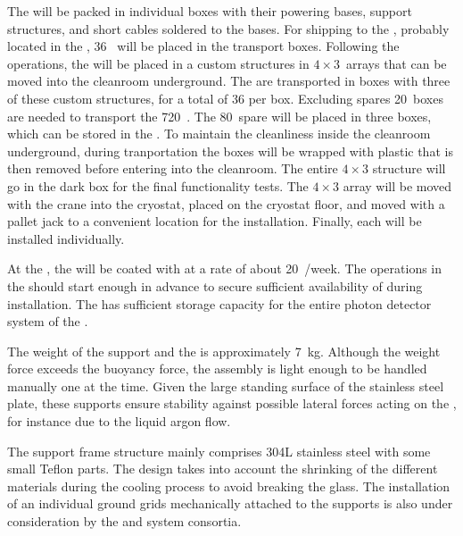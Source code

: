 The  will be packed in individual boxes with their powering bases, support structures, and short  cables soldered to the bases.
For shipping to the , probably located in the , 36~ will  be placed in the transport boxes.
Following the  operations, the  will be placed in a custom structures in $4 \times 3$~arrays that can be moved into the cleanroom underground.
The  are transported in boxes with three of these custom structures, for a total of 36 per box.
Excluding spares 20~boxes are needed to transport the 720~.
The 80~spare  will be placed in three boxes, which can be stored in the .
To maintain the cleanliness inside the cleanroom underground, during tranportation the boxes will be wrapped with plastic that is then removed before entering into the cleanroom.
The entire $4 \times 3$ structure will go in the dark box for the final functionality tests.
The $4 \times 3$ array will be moved with the crane into the cryostat, placed on the cryostat floor, and moved with a pallet jack to a convenient location for the installation. Finally, each  will be installed individually.

At the , the  will be coated with  at a rate of about 20~/week.
The operations in the  should start enough in advance to secure sufficient availability of  during installation.
The  has sufficient storage capacity for the entire photon detector system of the .

The weight of the support and the  is approximately 7~kg.
Although the weight force exceeds the buoyancy force, the assembly is light enough to be handled manually one at the time. 
Given the large standing surface of the stainless steel plate, these supports ensure stability against possible lateral forces acting on the , for instance due to the liquid argon flow.

The support frame structure mainly comprises 304L stainless steel with some small Teflon parts.
The design takes into account the shrinking of the different materials during the cooling process to avoid breaking the  glass.
The installation of an individual ground grids mechanically attached to the  supports is also under consideration by the  and  system consortia.

